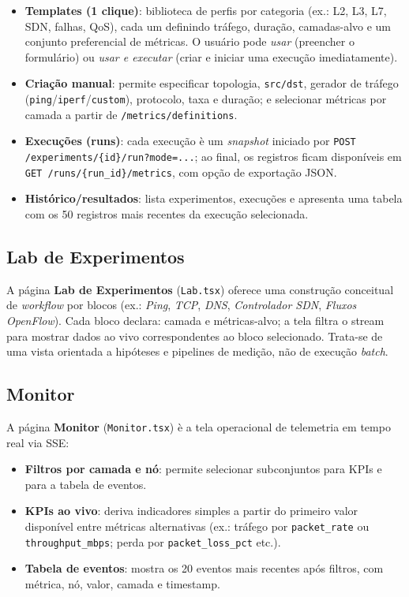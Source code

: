 \documentclass[12pt,oneside]{report}
\begin{document}
\begin{itemize}
\item \textbf{Templates (1 clique)}: biblioteca de perfis por categoria (ex.: L2, L3, L7, SDN, falhas, QoS), cada um definindo tr\'afego, dura\c{c}\~ao, camadas-alvo e um conjunto preferencial de m\'etricas. O usu\'ario pode \textit{usar} (preencher o formul\'ario) ou \textit{usar e executar} (criar e iniciar uma execu\c{c}\~ao imediatamente).
\item \textbf{Cria\c{c}\~ao manual}: permite especificar topologia, \texttt{src/dst}, gerador de tr\'afego (\texttt{ping}/\texttt{iperf}/\texttt{custom}), protocolo, taxa e dura\c{c}\~ao; e selecionar m\'etricas por camada a partir de \texttt{/metrics/definitions}.
\item \textbf{Execu\c{c}\~oes (runs)}: cada execu\c{c}\~ao \`e um \textit{snapshot} iniciado por \texttt{POST /experiments/\{id\}/run?mode=...}; ao final, os registros ficam dispon\'iveis em \texttt{GET /runs/\{run\_id\}/metrics}, com op\c{c}\~ao de exporta\c{c}\~ao JSON.
\item \textbf{Hist\'orico/resultados}: lista experimentos, execu\c{c}\~oes e apresenta uma tabela com os 50 registros mais recentes da execu\c{c}\~ao selecionada.
\end{itemize}

\subsection{Lab de Experimentos}
A p\'agina \textbf{Lab de Experimentos} (\texttt{Lab.tsx}) oferece uma constru\c{c}\~ao conceitual de \textit{workflow} por blocos (ex.: \textit{Ping}, \textit{TCP}, \textit{DNS}, \textit{Controlador SDN}, \textit{Fluxos OpenFlow}). Cada bloco declara: camada e m\'etricas-alvo; a tela filtra o stream para mostrar dados ao vivo correspondentes ao bloco selecionado. Trata-se de uma vista orientada a hip\'oteses e pipelines de medi\c{c}\~ao, n\~ao de execu\c{c}\~ao \textit{batch}.

\subsection{Monitor}
A p\'agina \textbf{Monitor} (\texttt{Monitor.tsx}) \`e a tela operacional de telemetria em tempo real via SSE:

\begin{itemize}
\item \textbf{Filtros por camada e n\'o}: permite selecionar subconjuntos para KPIs e para a tabela de eventos.
\item \textbf{KPIs ao vivo}: deriva indicadores simples a partir do primeiro valor dispon\'ivel entre m\'etricas alternativas (ex.: tr\'afego por \texttt{packet\_rate} ou \texttt{throughput\_mbps}; perda por \texttt{packet\_loss\_pct} etc.).
\item \textbf{Tabela de eventos}: mostra os 20 eventos mais recentes ap\'os filtros, com m\'etrica, n\'o, valor, camada e timestamp.
\end{itemize}
\end{document}

